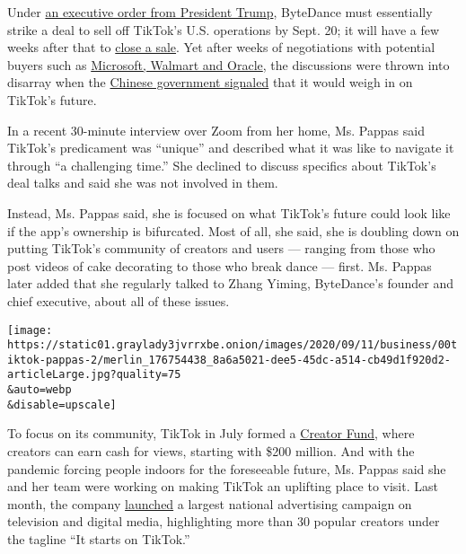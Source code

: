 Under
\href{https://www.nytimes3xbfgragh.onion/2020/08/06/technology/trump-wechat-tiktok-china.html}{an
executive order from President Trump}, ByteDance must essentially strike
a deal to sell off TikTok's U.S. operations by Sept. 20; it will have a
few weeks after that to
\href{https://www.nytimes3xbfgragh.onion/2020/08/14/business/tiktok-trump-bytedance-order.html}{close
a sale}. Yet after weeks of negotiations with potential buyers such as
\href{https://www.nytimes3xbfgragh.onion/2020/08/27/technology/walmart-tiktok-deal.html}{Microsoft,
Walmart and Oracle}, the discussions were thrown into disarray when the
\href{https://www.nytimes3xbfgragh.onion/2020/08/29/technology/china-tiktok-export-controls.html}{Chinese
government signaled} that it would weigh in on TikTok's future.

In a recent 30-minute interview over Zoom from her home, Ms. Pappas said
TikTok's predicament was ``unique'' and described what it was like to
navigate it through ``a challenging time.'' She declined to discuss
specifics about TikTok's deal talks and said she was not involved in
them.

Instead, Ms. Pappas said, she is focused on what TikTok's future could
look like if the app's ownership is bifurcated. Most of all, she said,
she is doubling down on putting TikTok's community of creators and users
--- ranging from those who post videos of cake decorating to those who
break dance --- first. Ms. Pappas later added that she regularly talked
to Zhang Yiming, ByteDance's founder and chief executive, about all of
these issues.

\texttt{[image: https://static01.graylady3jvrrxbe.onion/images/2020/09/11/business/00tiktok-pappas-2/merlin\_176754438\_8a6a5021-dee5-45dc-a514-cb49d1f920d2-articleLarge.jpg?quality=75\\\&auto=webp\\\&disable=upscale]}

To focus on its community, TikTok in July formed a
\href{https://newsroom.tiktok.com/en-us/introducing-the-200-million-tiktok-creator-fund}{Creator
Fund}, where creators can earn cash for views, starting with \$200
million. And with the pandemic forcing people indoors for the
foreseeable future, Ms. Pappas said she and her team were working on
making TikTok an uplifting place to visit. Last month, the company
\href{https://variety.com/2020/digital/news/tiktok-advertising-brand-campaign-sale-bytedance-1234738607/}{launched}
a largest national advertising campaign on television and digital media,
highlighting more than 30 popular creators under the tagline ``It starts
on TikTok.''

